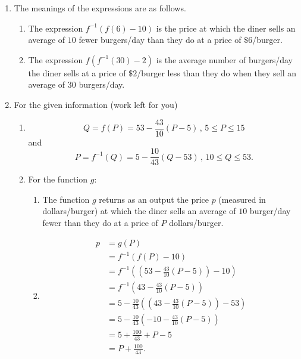 \documentclass{ximera}
\begin{document}
\begin{example}
\begin{explanation}
\begin{enumerate}
\item The meanings of the expressions are as follows.

\begin{enumerate}

\item The expression $f^{-1}(f(6)-10)$ is the price at which the diner sells an average of $10$ fewer burgers/day than they do at  a price of $\$6$/burger.

\item The expression $f(f^{-1}(30)-2)$ is the average number of burgers/day the diner sells at a price of $\$2$/burger less than they do when they sell an average of $30$ burgers/day. 

\end{enumerate}

\item For the given information (work left for you)
\begin{enumerate}
\item 
\[
   Q = f(P) = 53 - \frac{43}{10} \left( P - 5 \right) \, , \, 5 \leq P \leq 15
\]
and
\[
     P = f^{-1}(Q) = 5 - \frac{10}{43}  \left( Q - 53 \right) \, , \, 10 \leq Q \leq 53.
\]

\item For the function $g$:
\begin{enumerate}
  \item The function $g$ returns as an output the price $p$ (measured in dollars/burger) at which the diner sells an average of $10$ burger/day fewer than they do at a price of $P$ dollars/burger.

\item
\begin{align*}
      p & = g(P)   \\
         &= f^{-1}(f(P)-10) \\
         &= f^{-1}\left( \left(53 - \frac{43}{10} \left( P - 5 \right)\right) - 10  \right) \\
         &= f^{-1}\left( 43 - \frac{43}{10} \left( P - 5 \right) \right) \\
         &= 5 - \frac{10}{43}\left( \left( 43 - \frac{43}{10} \left( P - 5 \right) \right) - 53\right) \\
         &= 5 - \frac{10}{43}\left(  -10 - \frac{43}{10} \left( P - 5 \right)\right) \\
         &= 5 + \frac{100}{43}+ P-5 \\
         & = P + \frac{100}{43} . 
\end{align*}


\end{enumerate}
\end{enumerate}
\end{enumerate}
\end{explanation}
\end{example}
\end{document}
